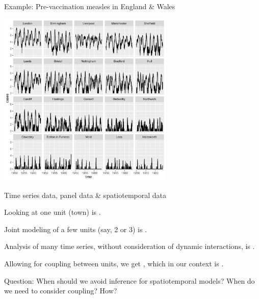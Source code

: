 \documentclass{beamer}
\begin{document}
\begin{frame}{Example: Pre-vaccination measles in England \& Wales}

\vspace{-2mm}

\begin{center}
\includegraphics[width=8.4cm]{he10-data.pdf}


\end{center}

\vspace{-2mm}
  
\end{frame}

\begin{frame}{Time series data, panel data \& spatiotemporal data}

  \bi
\item Looking at one unit (town) is .

  \item Joint modeling of a few units (say, 2 or 3) is .

\item Analysis of many time series, without consideration of dynamic interactions, is .

\item Allowing for coupling between units, we get , which in our context is .

  \ei
  
Question: When should we avoid inference for spatiotemporal models? When do we need to consider coupling? How?

\end{frame}
\end{document}
